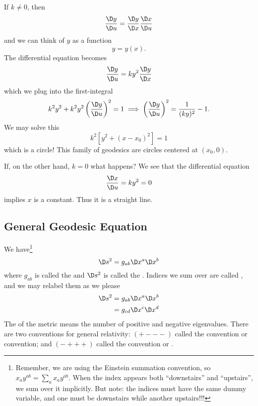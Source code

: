 \begin{ex}
If $k\not=0$, then
\begin{equation}
\frac{\D y}{\D u}=\frac{\D y}{\D x}\frac{\D x}{\D u}
\end{equation}
and we can think of $y$ as a function
\begin{equation}
y=y(x).
\end{equation}
The differential equation becomes
\begin{equation}
\frac{\D y}{\D u}=ky^{2}\frac{\D y}{\D x}
\end{equation}
which we plug into the first-integral
\begin{equation}
k^2y^2+k^2y^2\left(\frac{\D y}{\D u}\right)^{2}=1\implies
\left(\frac{\D y}{\D u}\right)^{2}=\frac{1}{(ky)^{2}}-1.
\end{equation}
We may solve this
\begin{equation}
k^{2}\left[
y^{2}+(x-x_{0})^{2}
\right]=1
\end{equation}
which is a circle! This family of geodesics are circles centered
at $(x_{0},0)$.

If, on the other hand, $k=0$ what happens? We see that the
differential equation
\begin{equation}
\frac{\D x}{\D u}=ky^{2}=0
\end{equation}
implies $x$ is a constant. Thus it is a straight line.
\end{ex}

\subsection{General Geodesic Equation}
We have\footnote{Remember, we are using the Einstein summation
  convention, so $x_{a}y^{ab}=\sum_{a}x_{a}y^{ab}$. When the
  index appears both ``downstairs'' and ``upstairs'', we sum over
  it implicitly. But note: the indices must have the same dummy
  variable, and one must be downstairs while another upstairs!!!}
\begin{equation}
\D s^{2}=g_{ab}\D x^{a}\D x^{b}
\end{equation}
where $g_{ab}$
is called the 
and $\D s^2$ is called the .
Indices we sum over are called , and we may
relabel them as we please
\begin{equation}
\begin{split}
\D s^{2} &= g_{ab}\D x^{a}\D x^{b}\\
&=g_{cd}\D x^{c}\D x^{d}
\end{split}
\end{equation}
The  of the metric means the number of positive
and negative eigenvalues. There are two conventions for general
relativity: $(+---)$ called the 
convention or  convention; and
$(-+++)$ called the  convention or
.

